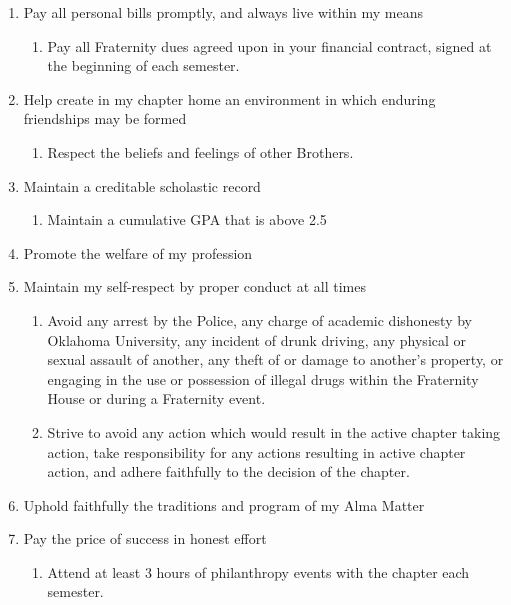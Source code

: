 \documentclass{article}
\begin{document}
\begin{enumerate}
\begin{enumerate}
    \end{enumerate}
    \item Pay all personal bills promptly, and always live within my means
    \begin{enumerate}
        \item Pay all Fraternity dues agreed upon in your financial contract, signed at the beginning of each semester.
    \end{enumerate}
    \item Help create in my chapter home an environment in which enduring friendships may be formed
    \begin{enumerate}
        \item Respect the beliefs and feelings of other Brothers.
    \end{enumerate}
    \item Maintain a creditable scholastic record
    \begin{enumerate}
        \item Maintain a cumulative GPA that is above 2.5
    \end{enumerate}
    \item Promote the welfare of my profession
    \item Maintain my self-respect by proper conduct at all times
    \begin{enumerate}
        \item Avoid any arrest by the Police, any charge of academic dishonesty by Oklahoma University, any incident of drunk driving, any physical or sexual assault of another, any theft of or damage to another’s property, or engaging in the use or possession of illegal drugs within the Fraternity House or during a Fraternity event.
        \item Strive to avoid any action which would result in the active chapter taking action, take responsibility for any actions resulting in active chapter action, and adhere faithfully to the decision of the chapter.
    \end{enumerate}
    \item Uphold faithfully the traditions and program of my Alma Matter
    \item Pay the price of success in honest effort
    \begin{enumerate}
        \item Attend at least 3 hours of philanthropy events with the chapter each semester.
    \end{enumerate}
\end{enumerate}
\end{document}
